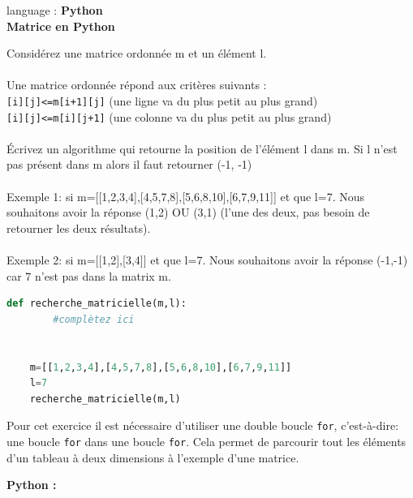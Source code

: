 \begin{Exercice}[10 minutes] language : \textbf{Python}\\
    
    \textbf{Matrice en Python}

    Considérez une matrice ordonnée m et un élément l.\\\\
    
    Une matrice ordonnée répond aux critères suivants :\\
     \lstinline{[i][j]<=m[i+1][j]} (une ligne va du plus petit au plus grand)\\
     \lstinline{[i][j]<=m[i][j+1]} (une colonne va du plus petit au plus grand)\\\\
 
    
    Écrivez un algorithme qui retourne la position de l’élément l dans m. Si l n’est pas présent dans m alors il faut retourner (-1, -1)\\\\
    
    Exemple 1: si m=[[1,2,3,4],[4,5,7,8],[5,6,8,10],[6,7,9,11]] et que l=7. Nous souhaitons avoir la réponse (1,2) OU (3,1) (l’une des deux, pas besoin de retourner les deux résultats).\\\\
    
    Exemple 2: si m=[[1,2],[3,4]] et que l=7. Nous souhaitons avoir la réponse (-1,-1) car 7 n’est pas dans la matrix m.\\


    \begin{lstlisting}[language=Python]
    def recherche_matricielle(m,l):
        #complètez ici
    
    
    m=[[1,2,3,4],[4,5,7,8],[5,6,8,10],[6,7,9,11]]
    l=7
    recherche_matricielle(m,l)
    \end{lstlisting}

    \begin{conseil}
    Pour cet exercice il est nécessaire d'utiliser une double boucle \lstinline{for}, c'est-à-dire: une boucle \lstinline{for} dans une boucle \lstinline{for}. Cela permet de parcourir tout les éléments d'un tableau à deux dimensions à l'exemple d'une matrice. 
    \end{conseil}

    \begin{solution}
        \textbf{Python :}
        
    \end{solution}

\end{Exercice}

